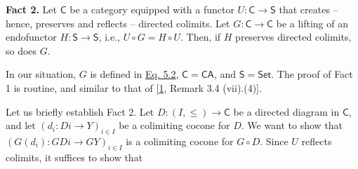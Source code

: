 \hypertarget{html:S7.I1.ix2}{}\textbf{Fact 2.}  %
\hypertarget{html:S7.I1.ix2.p1}{} Let %
\hypertarget{html:S7.I1.ix2.p1.m1}{}\({\mathsf{C}}\) be a category equipped with a functor %
\hypertarget{html:S7.I1.ix2.p1.m2}{}\({U\colon\mathsf{C}\to\mathsf{S}}\) that creates – hence, preserves and reflects – directed colimits. Let %
\hypertarget{html:S7.I1.ix2.p1.m3}{}\({G\colon\mathsf{C}\to\mathsf{C}}\) be a lifting of an endofunctor %
\hypertarget{html:S7.I1.ix2.p1.m4}{}\({H\colon\mathsf{S}\to\mathsf{S}}\), i.e., %
\hypertarget{html:S7.I1.ix2.p1.m5}{}\({U\circ G=H\circ U}\). Then, if %
\hypertarget{html:S7.I1.ix2.p1.m6}{}\({H}\) preserves directed colimits, so does %
\hypertarget{html:S7.I1.ix2.p1.m7}{}\({G}\).
\par\medskip
    In our situation, %
\hypertarget{html:S7.SS0.SSS0.P0.SPx1.p1.m1}{}\({G}\) is defined in \hyperlink{html:S5.E2}{Eq. 5.2}, %
\hypertarget{html:S7.SS0.SSS0.P0.SPx1.p1.m2}{}\({\mathsf{C}=\mathsf{CA}}\), and %
\hypertarget{html:S7.SS0.SSS0.P0.SPx1.p1.m3}{}\({\mathsf{S}=\mathsf{Set}}\). The proof of Fact 1 is routine, and similar to that of [\hyperlink{html:bib.bib1}{1}, Remark 3.4 (vii).(4)].
\par\medskip
\hypertarget{html:S7.SS0.SSS0.P0.SPx1.p2}{} Let us briefly establish Fact 2. Let %
\hypertarget{html:S7.SS0.SSS0.P0.SPx1.p2.m1}{}\({D\colon(I,\leq)\to\mathsf{C}}\) be a directed diagram in %
\hypertarget{html:S7.SS0.SSS0.P0.SPx1.p2.m2}{}\({\mathsf{C}}\), and let %
\hypertarget{html:S7.SS0.SSS0.P0.SPx1.p2.m3}{}\({(d_{i}\colon Di\to Y)_{i\in I}}\) be a colimiting cocone for %
\hypertarget{html:S7.SS0.SSS0.P0.SPx1.p2.m4}{}\({D}\). We want to show that %
\hypertarget{html:S7.SS0.SSS0.P0.SPx1.p2.m5}{}\({(G(d_{i})\colon GDi\to GY)_{i\in I}}\) is a colimiting cocone for %
\hypertarget{html:S7.SS0.SSS0.P0.SPx1.p2.m6}{}\({G\circ D}\). Since %
\hypertarget{html:S7.SS0.SSS0.P0.SPx1.p2.m7}{}\({U}\) reflects colimits, it suffices to show that %
